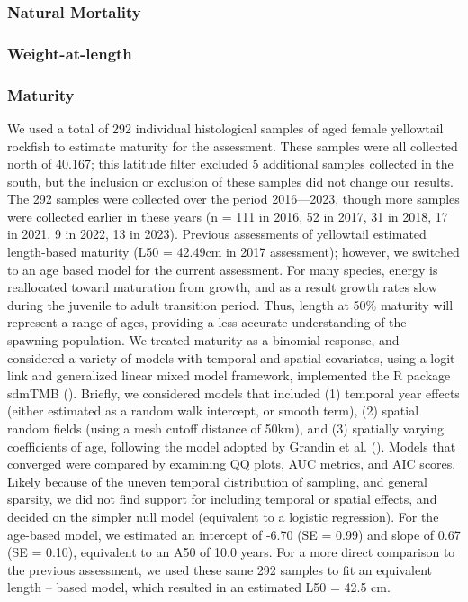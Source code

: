 \documentclass[
]{scrartcl}
\begin{document}
\subsubsection{Natural Mortality}\label{natural-mortality}

\subsubsection{Weight-at-length}\label{weight-at-length}

\subsubsection{Maturity}\label{maturity}

We used a total of 292 individual histological samples of aged female
yellowtail rockfish to estimate maturity for the assessment. These
samples were all collected north of 40.167; this latitude filter
excluded 5 additional samples collected in the south, but the inclusion
or exclusion of these samples did not change our results. The 292
samples were collected over the period 2016---2023, though more samples
were collected earlier in these years (n = 111 in 2016, 52 in 2017, 31
in 2018, 17 in 2021, 9 in 2022, 13 in 2023). Previous assessments of
yellowtail estimated length-based maturity (L50 = 42.49cm in 2017
assessment); however, we switched to an age based model for the current
assessment. For many species, energy is reallocated toward maturation
from growth, and as a result growth rates slow during the juvenile to
adult transition period. Thus, length at 50\% maturity will represent a
range of ages, providing a less accurate understanding of the spawning
population. We treated maturity as a binomial response, and considered a
variety of models with temporal and spatial covariates, using a logit
link and generalized linear mixed model framework, implemented the R
package sdmTMB ().
Briefly, we considered models that included (1) temporal year effects
(either estimated as a random walk intercept, or smooth term), (2)
spatial random fields (using a mesh cutoff distance of 50km), and (3)
spatially varying coefficients of age, following the model adopted by
Grandin et al. (). Models that
converged were compared by examining QQ plots, AUC metrics, and AIC
scores. Likely because of the uneven temporal distribution of sampling,
and general sparsity, we did not find support for including temporal or
spatial effects, and decided on the simpler null model (equivalent to a
logistic regression). For the age-based model, we estimated an intercept
of -6.70 (SE = 0.99) and slope of 0.67 (SE = 0.10), equivalent to an A50
of 10.0 years. For a more direct comparison to the previous assessment,
we used these same 292 samples to fit an equivalent length -- based
model, which resulted in an estimated L50 = 42.5 cm.
\end{document}
